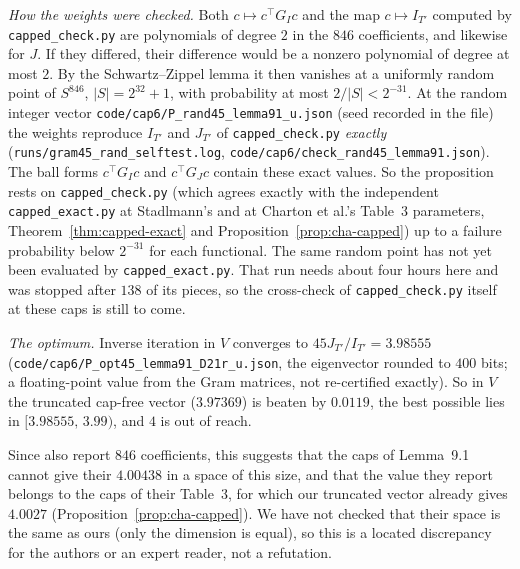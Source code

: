 \emph{How the weights were checked.} Both $c\mapsto c^{\top}G_Ic$ and the map
$c\mapsto I_{T'}$ computed by \texttt{capped\_check.py} are polynomials of
degree $2$ in the $846$ coefficients, and likewise for $J$. If they differed,
their difference would be a nonzero polynomial of degree at most $2$. By the
Schwartz--Zippel lemma it then vanishes at a uniformly random point of
$S^{846}$, $|S|=2^{32}+1$, with probability at most $2/|S|<2^{-31}$. At the
random integer vector \texttt{code/cap6/P\_rand45\_lemma91\_u.json} (seed
recorded in the file) the weights reproduce $I_{T'}$ and $J_{T'}$ of
\texttt{capped\_check.py} \emph{exactly}
(\texttt{runs/gram45\_rand\_selftest.log}, \texttt{code/cap6/check\_rand45\_lemma91.json}).
The ball forms $c^{\top}G_Ic$ and $c^{\top}G_Jc$ contain these exact
values. So the proposition rests on \texttt{capped\_check.py} (which agrees
exactly with the independent \texttt{capped\_exact.py} at Stadlmann's and at
Charton et al.'s Table~3 parameters, Theorem~\ref{thm:capped-exact} and
Proposition~\ref{prop:cha-capped}) up to a failure probability below
$2^{-31}$ for each functional. The same random point has not yet been
evaluated by \texttt{capped\_exact.py}. That run needs about four hours here
and was stopped after $138$ of its pieces, so the cross-check of
\texttt{capped\_check.py} itself at these caps is still to come.

\begin{sloppypar}
\emph{The optimum.} Inverse iteration in $V$ converges to
$45J_{T'}/I_{T'}=3.98555$ (\texttt{code/cap6/}\allowbreak\texttt{P\_opt45\_lemma91\_D21r\_u.json},
the eigenvector rounded to $400$ bits; a floating-point value from the Gram
matrices, not re-certified exactly). So in $V$ the truncated cap-free vector
($3.97369$) is beaten by $0.0119$, the best possible lies in
$[3.98555,\,3.99)$, and $4$ is out of reach.
\end{sloppypar}

Since \cite{Cha26} also report $846$ coefficients, this suggests that the
caps of Lemma~9.1 cannot give their $4.00438$ in a space of this size, and
that the value they report belongs to the caps of their Table~3, for which our
truncated vector already gives $4.0027$
(Proposition~\ref{prop:cha-capped}). We have not checked that their space
is the same as ours (only the dimension is equal), so this is a located
discrepancy for the authors or an expert reader, not a refutation.

